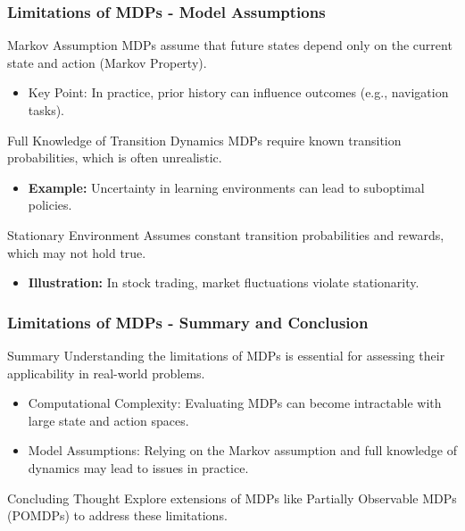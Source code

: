 \documentclass[aspectratio=169]{beamer}
\begin{document}
\begin{frame}[fragile]
    \frametitle{Limitations of MDPs - Model Assumptions}
    \begin{block}{Markov Assumption}
        MDPs assume that future states depend only on the current state and action (Markov Property). 
        \begin{itemize}
            \item Key Point: In practice, prior history can influence outcomes (e.g., navigation tasks).
        \end{itemize}
    \end{block}

    \begin{block}{Full Knowledge of Transition Dynamics}
        MDPs require known transition probabilities, which is often unrealistic.
        \begin{itemize}
            \item \textbf{Example:} Uncertainty in learning environments can lead to suboptimal policies.
        \end{itemize}
    \end{block}

    \begin{block}{Stationary Environment}
        Assumes constant transition probabilities and rewards, which may not hold true.
        \begin{itemize}
            \item \textbf{Illustration:} In stock trading, market fluctuations violate stationarity.
        \end{itemize}
    \end{block}
\end{frame}

\begin{frame}[fragile]
    \frametitle{Limitations of MDPs - Summary and Conclusion}
    \begin{block}{Summary}
        Understanding the limitations of MDPs is essential for assessing their applicability in real-world problems. 
        \begin{itemize}
            \item Computational Complexity: Evaluating MDPs can become intractable with large state and action spaces.
            \item Model Assumptions: Relying on the Markov assumption and full knowledge of dynamics may lead to issues in practice.
        \end{itemize}
    \end{block}

    \begin{block}{Concluding Thought}
        Explore extensions of MDPs like Partially Observable MDPs (POMDPs) to address these limitations.
    \end{block}
\end{frame}
\end{document}
